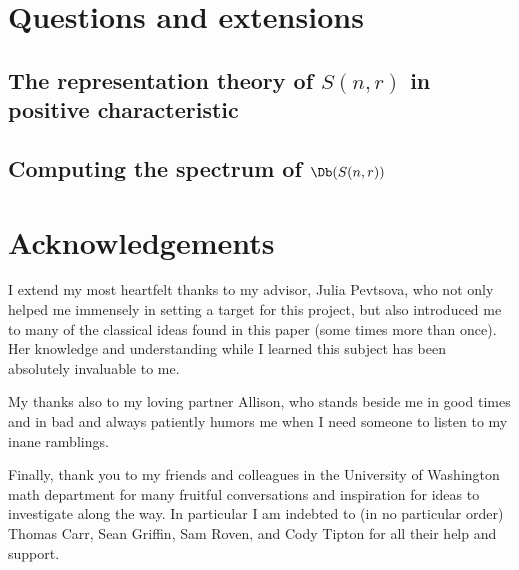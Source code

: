\documentclass[12pt]{article}
\begin{document}
\section{Questions and extensions}
\subsection*{The representation theory of \texorpdfstring{$S(n,r)$}{S(n,r)} in positive characteristic}

\subsection*{Computing the spectrum of \texorpdfstring{$\Db(S(n,r))$}{DbS(n,r)}}

\newpage
\section*{Acknowledgements}
\label{sec:ack}
I extend my most heartfelt thanks to my advisor, Julia Pevtsova, who not only helped me immensely in setting a target 
for this project, but also introduced me to many of the classical ideas found in this paper (some times more than once). 
Her knowledge and understanding while I learned this subject has been absolutely invaluable to me.

My thanks also to my loving partner Allison, who stands beside me in good times and in bad and always patiently humors me when 
I need someone to listen to my inane ramblings.

Finally, thank you to my friends and colleagues in the University of Washington math department for many fruitful conversations 
and inspiration for ideas to investigate along the way. In particular I am indebted to (in no particular order) Thomas Carr, Sean Griffin, Sam Roven, and Cody Tipton
for all their help and support.

\medskip

\printbibliography
{}
\end{document}
